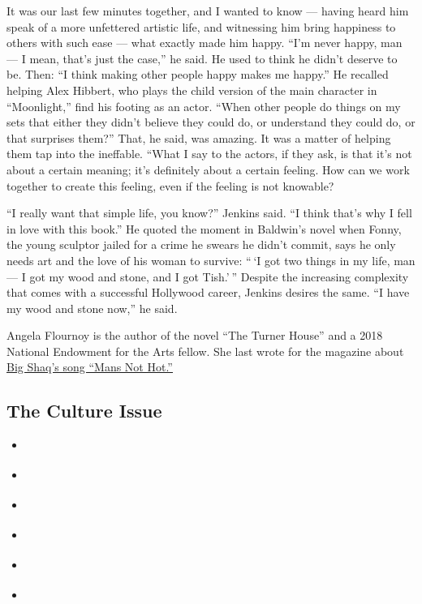 It was our last few minutes together, and I wanted to know --- having
heard him speak of a more unfettered artistic life, and witnessing him
bring happiness to others with such ease --- what exactly made him
happy. ``I'm never happy, man --- I mean, that's just the case,'' he
said. He used to think he didn't deserve to be. Then: ``I think making
other people happy makes me happy.'' He recalled helping Alex Hibbert,
who plays the child version of the main character in ``Moonlight,'' find
his footing as an actor. ``When other people do things on my sets that
either they didn't believe they could do, or understand they could do,
or that surprises them?'' That, he said, was amazing. It was a matter of
helping them tap into the ineffable. ``What I say to the actors, if they
ask, is that it's not about a certain meaning; it's definitely about a
certain feeling. How can we work together to create this feeling, even
if the feeling is not knowable?

``I really want that simple life, you know?'' Jenkins said. ``I think
that's why I fell in love with this book.'' He quoted the moment in
Baldwin's novel when Fonny, the young sculptor jailed for a crime he
swears he didn't commit, says he only needs art and the love of his
woman to survive: `` `I got two things in my life, man --- I got my wood
and stone, and I got Tish.' '' Despite the increasing complexity that
comes with a successful Hollywood career, Jenkins desires the same. ``I
have my wood and stone now,'' he said.

Angela Flournoy is the author of the novel ``The Turner House'' and a
2018 National Endowment for the Arts fellow. She last wrote for the
magazine about
\href{https://www.nytimes3xbfgragh.onion/interactive/2018/03/08/magazine/25-songs-future-of-music.html\#/big-shaq}{Big
Shaq's song ``Mans Not Hot.''}

\hypertarget{the-culture-issue}{%
\subsection{The Culture Issue}\label{the-culture-issue}}

\begin{itemize}
\tightlist
\item
  \href{https://www.nytimes3xbfgragh.onion/interactive/2018/10/03/magazine/lady-gaga-movie-star-is-born.html}{}
\item
  \href{https://www.nytimes3xbfgragh.onion/interactive/2018/10/03/magazine/morality-social-justice-art-entertainment.html}{}
\item
  \href{https://www.nytimes3xbfgragh.onion/interactive/2018/10/04/magazine/good-place-michael-schur-philosophy.html}{}
\item
  \href{https://www.nytimes3xbfgragh.onion/interactive/2018/10/04/magazine/barry-jenkins-james-baldwin-if-beale-street-could-talk.html}{}
\item
  \href{https://www.nytimes3xbfgragh.onion/interactive/2018/10/05/magazine/instagram-cindy-sherman-ugly-beauty.html}{}
\item
  \href{https://www.nytimes3xbfgragh.onion/interactive/2018/10/05/magazine/culture-moments-2018.html}{}
\end{itemize}

